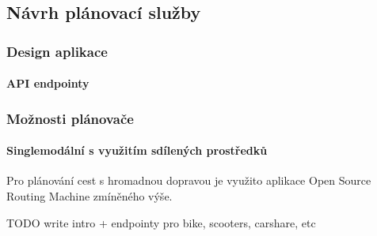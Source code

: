 \documentclass[thesis=M,czech]{FITthesis}[2019/12/23]
\theoremstyle{plain}
\theoremstyle{definition}
\begin{document}
\subsection{Návrh plánovací služby}



\subsubsection{Design aplikace}


\paragraph{API endpointy}





\subsubsection{Možnosti plánovače}

\paragraph{Singlemodální s využitím sdílených prostředků}

Pro plánování cest s hromadnou dopravou je využito aplikace Open Source Routing Machine zmíněného výše.

TODO write intro + endpointy pro bike, scooters, carshare, etc
\end{document}
